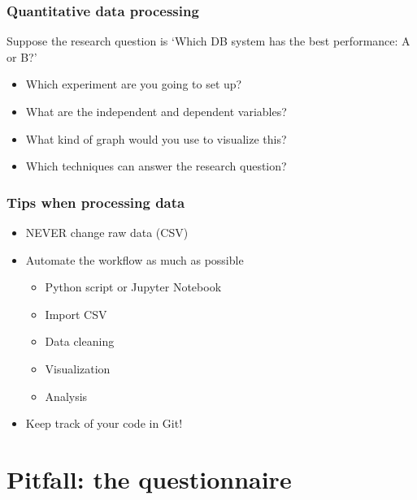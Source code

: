 \documentclass[aspectratio=169]{beamer}
\begin{document}
\begin{frame}
  \frametitle{Quantitative data processing}

  Suppose the research question is `Which DB system has the best performance: A or B?'
  
  \begin{itemize}
      \item<+-> Which experiment are you going to set up?
      \item<+-> What are the independent and dependent variables?
      \item<+-> What kind of graph would you use to visualize this?
      \item<+-> Which techniques can answer the research question?
  \end{itemize}

 
\end{frame}

\begin{frame}    
    \frametitle{Tips when processing data}    
    \begin{itemize}
        \item NEVER change raw data (CSV)
        \item Automate the workflow as much as possible
        \begin{itemize}
            \item Python script or Jupyter Notebook
            \item Import CSV
            \item Data cleaning
            \item Visualization
            \item Analysis
        \end{itemize}
        \item Keep track of your code in Git!
    \end{itemize}
 

\end{frame}

\section{Pitfall: the questionnaire}
\end{document}
